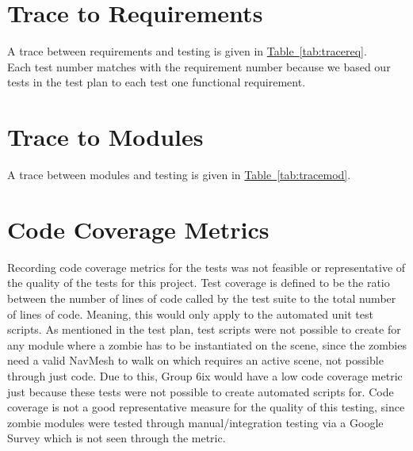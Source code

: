 \documentclass[12pt, titlepage]{article}
\begin{document}
\section{Trace to Requirements}
		A trace between requirements and testing is given in \hyperref[tab:tracereq]{Table~\ref*{tab:tracereq}}.\\
		Each test number matches with the requirement number because we based our tests in the test plan to each test one functional requirement. 



\section{Trace to Modules}	
A trace between modules and testing is given in \hyperref[tab:tracemod]{Table~\ref*{tab:tracemod}}.\\



\section{Code Coverage Metrics}
Recording code coverage metrics for the tests was not feasible or representative of the quality of the tests for this project. Test coverage is defined to be the ratio between the number of lines
of code called by the test suite to the total number of lines of code. Meaning, this would only apply to the automated unit test scripts. As mentioned in the test plan, test scripts were not possible
to create for any module where a zombie has to be instantiated on the scene, since the zombies need a valid NavMesh to walk on which requires an active scene, not possible through just code. Due to this, Group 6ix would have a low code coverage metric just because these tests were not possible to create automated scripts for. Code coverage is not a good representative measure for the quality of this testing, since zombie modules were tested through manual/integration testing via a Google Survey which is not seen through the metric.
\end{document}

